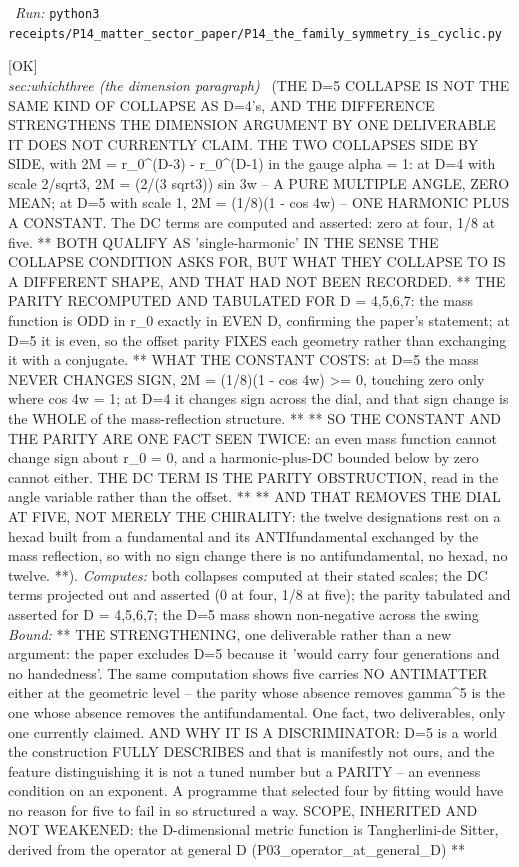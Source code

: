 \begin{description}
\ \emph{Run:} \texttt{python3 receipts/P14\_matter\_sector\_paper/P14\_the\_family\_symmetry\_is\_cyclic.py}
\item[\rcptlabel{P14_the_d5_world}{P14R36}\textbf{P14R36}\quad\texttt{P14\_the\_d5\_world}]\hfill\textsf{[OK]}\\
\textit{sec:whichthree (the dimension paragraph)} \ (THE D=5 COLLAPSE IS NOT THE SAME KIND OF COLLAPSE AS D=4's, AND THE DIFFERENCE STRENGTHENS THE DIMENSION ARGUMENT BY ONE DELIVERABLE IT DOES NOT CURRENTLY CLAIM. THE TWO COLLAPSES SIDE BY SIDE, with 2M = r\_0\textasciicircum{}(D-3) - r\_0\textasciicircum{}(D-1) in the gauge alpha = 1: at D=4 with scale 2/sqrt3, 2M = (2/(3 sqrt3)) sin 3w -- A PURE MULTIPLE ANGLE, ZERO MEAN; at D=5 with scale 1, 2M = (1/8)(1 - cos 4w) -- ONE HARMONIC PLUS A CONSTANT. The DC terms are computed and asserted: zero at four, 1/8 at five. ** BOTH QUALIFY AS 'single-harmonic' IN THE SENSE THE COLLAPSE CONDITION ASKS FOR, BUT WHAT THEY COLLAPSE TO IS A DIFFERENT SHAPE, AND THAT HAD NOT BEEN RECORDED. ** THE PARITY RECOMPUTED AND TABULATED FOR D = 4,5,6,7: the mass function is ODD in r\_0 exactly in EVEN D, confirming the paper's statement; at D=5 it is even, so the offset parity FIXES each geometry rather than exchanging it with a conjugate. ** WHAT THE CONSTANT COSTS: at D=5 the mass NEVER CHANGES SIGN, 2M = (1/8)(1 - cos 4w) >= 0, touching zero only where cos 4w = 1; at D=4 it changes sign across the dial, and that sign change is the WHOLE of the mass-reflection structure. ** ** SO THE CONSTANT AND THE PARITY ARE ONE FACT SEEN TWICE: an even mass function cannot change sign about r\_0 = 0, and a harmonic-plus-DC bounded below by zero cannot either. THE DC TERM IS THE PARITY OBSTRUCTION, read in the angle variable rather than the offset. ** ** AND THAT REMOVES THE DIAL AT FIVE, NOT MERELY THE CHIRALITY: the twelve designations rest on a hexad built from a fundamental and its ANTIfundamental exchanged by the mass reflection, so with no sign change there is no antifundamental, no hexad, no twelve. **). 
\emph{Computes:} both collapses computed at their stated scales; the DC terms projected out and asserted (0 at four, 1/8 at five); the parity tabulated and asserted for D = 4,5,6,7; the D=5 mass shown non-negative across the swing
 \emph{Bound:} ** THE STRENGTHENING, one deliverable rather than a new argument: the paper excludes D=5 because it 'would carry four generations and no handedness'. The same computation shows five carries NO ANTIMATTER either at the geometric level -- the parity whose absence removes gamma\textasciicircum{}5 is the one whose absence removes the antifundamental. One fact, two deliverables, only one currently claimed. AND WHY IT IS A DISCRIMINATOR: D=5 is a world the construction FULLY DESCRIBES and that is manifestly not ours, and the feature distinguishing it is not a tuned number but a PARITY -- an evenness condition on an exponent. A programme that selected four by fitting would have no reason for five to fail in so structured a way. SCOPE, INHERITED AND NOT WEAKENED: the D-dimensional metric function is Tangherlini-de Sitter, derived from the operator at general D (P03\_operator\_at\_general\_D) **

\end{description}
